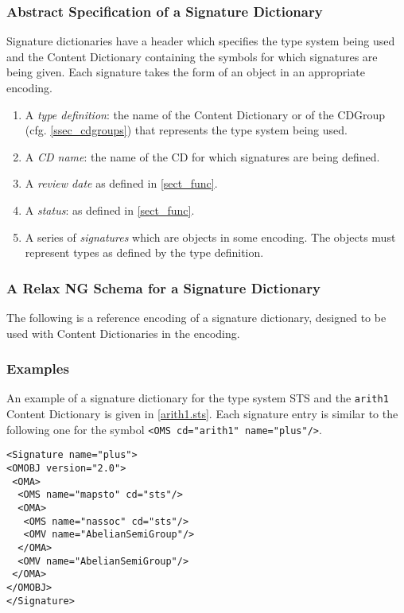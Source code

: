 \subsubsection{Abstract Specification  of a Signature Dictionary}\label{sect_sigpcdata}

Signature dictionaries have a header which specifies the type system being used and the
Content Dictionary containing the symbols for which signatures are being given. Each
signature takes the form of an \OM object in an appropriate encoding.

\begin{enumerate}
\item A \emph{type definition}: the name of the Content Dictionary or of the CDGroup
  (cfg. \ref{ssec_cdgroups}) that represents the type system being used.
\item A \emph{CD name}: the name of the CD for which signatures are being defined.
\item A \emph{review date} as defined in \ref{sect_func}.
\item A \emph{status}: as defined in \ref{sect_func}.
\item A series of \emph{signatures} which are \OM objects in some encoding.  The objects
  must represent types as defined by the type definition.
\end{enumerate}

\subsubsection{A Relax NG Schema for a Signature Dictionary}\label{sect_sigschema}

The following is a reference encoding of a signature dictionary,
designed to be used with Content Dictionaries in the \XML encoding.



\subsubsection{Examples}\label{sect_sigex}

An example of a signature dictionary for the type system STS and the \lstinline|arith1|
Content Dictionary is given in \ref{arith1.sts}. Each signature entry is similar to the
following one for the \OM symbol \lstinline|<OMS cd="arith1" name="plus"/>|.

\begin{lstlisting}
<Signature name="plus">
<OMOBJ version="2.0">
 <OMA>
  <OMS name="mapsto" cd="sts"/>
  <OMA>
   <OMS name="nassoc" cd="sts"/> 
   <OMV name="AbelianSemiGroup"/>
  </OMA>
  <OMV name="AbelianSemiGroup"/>
 </OMA>
</OMOBJ>
</Signature>
\end{lstlisting}

